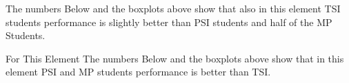 \documentclass[12pt]{extreport}
\begin{document}
The numbers Below and the boxplots above show that also in this element  TSI students performance is slightly better than PSI students and half of the MP Students.

For This Element The numbers Below and the boxplots above show that in this element  PSI and MP students performance is  better than TSI.

\begin{comment}
\subparagraph{Interpretation of the Box-plots:}
For This Element 

\begin{enumerate}	
	\item The MP Class Box-Plot:
	\begin{enumerate}
		\item MAX = a {} {} {} {} {} {} {} {} UQ = b {} {} {} {} {} {} {} {} Median = c
		\item LQ = d {} {} {} {} {} {} {} {}  MIN =	l {} {} {} {} {} {} {} {}  IQR = e - f = g
	\end{enumerate}
	\item The PSI Class Box-Plot:
	\begin{enumerate}
		\item MAX = a {} {} {} {} {} {} {} {} UQ = b {} {} {} {} {} {} {} {} Median = c
		\item LQ = d {} {} {} {} {} {} {} {}  MIN =	e {} {} {} {} {} {} {} {} IQR = f - g = h	
	\end{enumerate}
	\item The TSI Class Box-Plot:
	\begin{enumerate}
		\item MAX = a {} {} {} {} {} {} {} {} UQ = b {} {} {} {} {} {} {} {} Median = c
		\item LQ = d {} {} {} {} {} {} {} {} MIN = e {} {} {} {} {} {} {} {} IQR = f - g = h	
	\end{enumerate}
\end{enumerate}


\subparagraph{Interpretation of the histogram:}
This Frequency Distribution is (Skeness) with the following descriptive statistics:
\begin{enumerate}
	\item Mean = 
	\item STD = 
	\item Range = a - b = c
	\item IQR = a-b = c 
\end{enumerate}
\end{comment}
\end{document}
